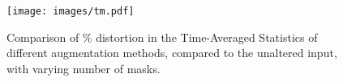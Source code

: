 \documentclass{article}
\newcommand{\SpA}{{\textsc{SpliceOut}}\xspace}
\begin{document}
%
\begin{figure}[h]



\texttt{[image: images/tm.pdf]}
\label{fig:summstats}
\caption{Comparison of \% distortion in the Time-Averaged Statistics of different augmentation methods, compared to the unaltered input, with varying number of masks.}
\end{figure}
\end{document}
